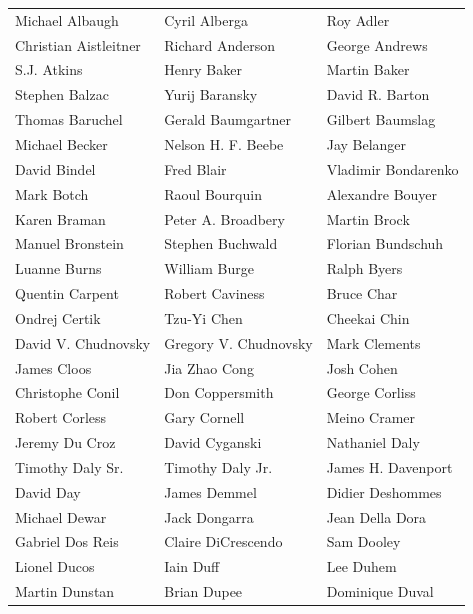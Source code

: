 \begin{tabular}{lll}
Michael Albaugh        & Cyril Alberga          & Roy Adler\\
Christian Aistleitner  & Richard Anderson       & George Andrews\\
S.J. Atkins            & Henry Baker            & Martin Baker\\
Stephen Balzac         & Yurij Baransky         & David R. Barton\\
Thomas Baruchel        & Gerald Baumgartner     & Gilbert Baumslag\\
Michael Becker         & Nelson H. F. Beebe     & Jay Belanger\\
David Bindel           & Fred Blair             & Vladimir Bondarenko\\
Mark Botch             & Raoul Bourquin         & Alexandre Bouyer\\
Karen Braman           & Peter A. Broadbery     & Martin Brock\\
Manuel Bronstein       & Stephen Buchwald       & Florian Bundschuh\\
Luanne Burns           & William Burge          & Ralph Byers\\
Quentin Carpent        & Robert Caviness        & Bruce Char\\
Ondrej Certik          & Tzu-Yi Chen            & Cheekai Chin\\
David V. Chudnovsky    & Gregory V. Chudnovsky  & Mark Clements\\
James Cloos            & Jia Zhao Cong          & Josh Cohen\\
Christophe Conil       & Don Coppersmith        & George Corliss\\
Robert Corless         & Gary Cornell           & Meino Cramer\\
Jeremy Du Croz         & David Cyganski         & Nathaniel Daly\\
Timothy Daly Sr.       & Timothy Daly Jr.       & James H. Davenport\\
David Day              & James Demmel           & Didier Deshommes\\
Michael Dewar          & Jack Dongarra          & Jean Della Dora\\
Gabriel Dos Reis       & Claire DiCrescendo     & Sam Dooley\\
Lionel Ducos           & Iain Duff              & Lee Duhem\\
Martin Dunstan         & Brian Dupee            & Dominique Duval\\

\end{tabular}
